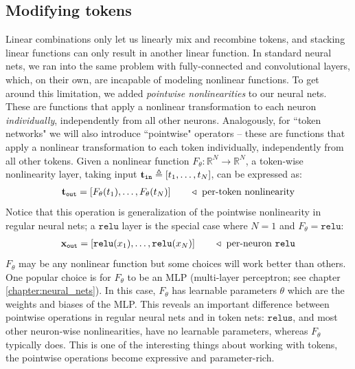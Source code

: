 \subsection{Modifying tokens}\label{sec:transformers:modifying_tokens}
Linear combinations only let us linearly mix and recombine tokens, and stacking linear functions can only result in another linear function. In standard neural nets, we ran into the same problem with fully-connected and convolutional layers, which, on their own, are incapable of modeling nonlinear functions. To get around this limitation, we added \textit{pointwise nonlinearities} to our neural nets. These are functions that apply a nonlinear transformation to each neuron \textit{individually}, independently from all other neurons. Analogously, for ``token networks" we will also introduce ``pointwise" operators -- these are functions that apply a nonlinear transformation to each token individually, independently from all other tokens. Given a nonlinear function $F_{\theta}: \mathbb{R}^N \rightarrow \mathbb{R}^N$, a token-wise nonlinearity layer, taking input $\mathbf{t}_{\texttt{in}} \triangleq [t_1, \ldots, t_N]$, can be expressed as:
\begin{align}
    \mathbf{t}_{\texttt{out}} = [F_{\theta}(t_1), \ldots, F_{\theta}(t_N)] \quad\quad \triangleleft \text{ per-token nonlinearity}
\end{align}
Notice that this operation is generalization of the pointwise nonlinearity in regular neural nets; a $\texttt{relu}$ layer is the special case where $N=1$ and $F_{\theta} = \texttt{relu}$:
\begin{align}
    \mathbf{x}_{\texttt{out}} = [\texttt{relu}(x_1), \ldots,\texttt{relu}(x_N)] \quad\quad \triangleleft \text{ per-neuron \texttt{relu}}
\end{align}
$F_{\theta}$ may be any nonlinear function but some choices will work better than others. One popular choice is for $F_{\theta}$ to be an MLP (multi-layer perceptron; see chapter \ref{chapter:neural_nets}). In this case, $F_{\theta}$ has learnable parameters $\theta$ which are the weights and biases of the MLP. This reveals an important difference between pointwise operations in regular neural nets and in token nets: $\texttt{relus}$, and most other neuron-wise nonlinearities, have no learnable parameters, whereas $F_{\theta}$ typically does. This is one of the interesting things about working with tokens, the pointwise operations become expressive and parameter-rich.

